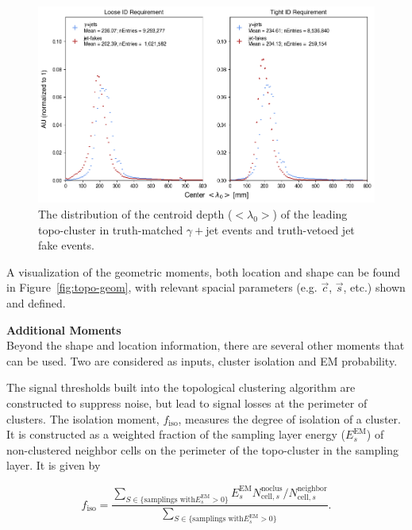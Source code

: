 \begin{figure}[!htbp]
    \centering 
    \includegraphics[width=\textwidth]{chapters/chapter4_photonID/images/hists/y_topoCluster0_centerLambda.png}
    \caption[The distribution of the centroid depth ($<\lambda_{0}>$) of the leading topo-cluster]{The distribution of the centroid depth ($<\lambda_{0}>$) of the leading topo-cluster in truth-matched $\gamma+$jet events and truth-vetoed jet fake events.}
    \label{fig:topo-centerLambda}
\end{figure}

A visualization of the geometric moments, both location and shape can be found in Figure~\ref{fig:topo-geom}, with relevant spacial parameters (e.g. $\vec{c}$, $\vec{s}$, etc.) shown and defined.



\noindent\textbf{Additional Moments}\\
\indent Beyond the shape and location information, there are several other moments that can be used. Two are considered as inputs, cluster isolation and \gls{EM} probability.

The signal thresholds built into the topological clustering algorithm are constructed to suppress noise, but lead to signal losses at the perimeter of clusters. The isolation moment, $f_{\text{iso}}$, measures the degree of isolation of a cluster. It is constructed as a weighted fraction of the sampling layer energy ($E_{s}^{\text{EM}}$) of non-clustered neighbor cells on the perimeter of the topo-cluster in the sampling layer. It is given by

\begin{equation}
    f_{\text{iso}} = \frac
    {
    \sum_{S \in \{ \text{samplings with} E_{s}^{\text{EM}} > 0 \} }  
    E_{s}^{\text{EM}} N_{\text{cell},s}^{\text{noclus}} / N_{\text{cell},s}^{\text{neighbor}}
    } 
    {
        \sum_{S \in \{ \text{samplings with} E_{s}^{\text{EM}} > 0 \} }
    }.
\end{equation}

